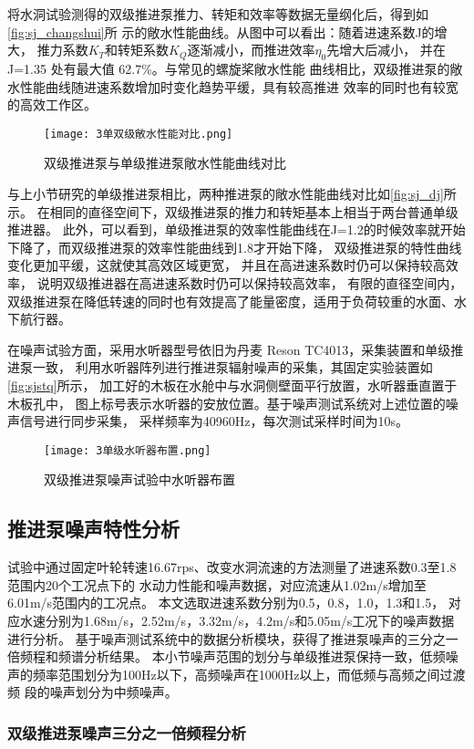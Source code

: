 将水洞试验测得的双级推进泵推力、转矩和效率等数据无量纲化后，得到如\autoref{fig:sj_changshui}所
示的敞水性能曲线。从图中可以看出：随着进速系数J的增大，
推力系数$K_T$和转矩系数$K_Q$逐渐减小，而推进效率$\eta_0$先增大后减小，
并在 J=1.35 处有最大值 62.7\%。与常见的螺旋桨敞水性能
曲线相比，双级推进泵的敞水性能曲线随进速系数增加时变化趋势平缓，具有较高推进
效率的同时也有较宽的高效工作区。
\begin{figure}[htbp]
    \centering
    \texttt{[image: 3单双级敞水性能对比.png]}
    \caption{\label{fig:sj_dj}双级推进泵与单级推进泵敞水性能曲线对比}
\end{figure}

与上小节研究的单级推进泵相比，两种推进泵的敞水性能曲线对比如\autoref{fig:sj_dj}所示。
在相同的直径空间下，双级推进泵的推力和转矩基本上相当于两台普通单级推进器。
此外，可以看到，单级推进泵的效率性能曲线在J=1.2的时候效率就开始下降了，而双级推进泵的效率性能曲线到1.8才开始下降，
双级推进泵的特性曲线变化更加平缓，这就使其高效区域更宽，
并且在高进速系数时仍可以保持较高效率，
说明双级推进器在高进速系数时仍可以保持较高效率，
有限的直径空间内，双级推进泵在降低转速的同时也有效提高了能量密度，适用于负荷较重的水面、水下航行器。

在噪声试验方面，采用水听器型号依旧为丹麦 Reson TC4013，采集装置和单级推进泵一致，
利用水听器阵列进行推进泵辐射噪声的采集，其固定实验装置如\autoref{fig:sjstq}所示，
加工好的木板在水舱中与水洞侧壁面平行放置，水听器垂直置于木板孔中，
图上标号表示水听器的安放位置。基于噪声测试系统对上述位置的噪声信号进行同步采集，
采样频率为40960Hz，每次测试采样时间为10s。
\begin{figure}[htbp]
    \centering
    \texttt{[image: 3单级水听器布置.png]}
    \caption{\label{fig:sjstq}双级推进泵噪声试验中水听器布置}
\end{figure}
\subsection{推进泵噪声特性分析}
试验中通过固定叶轮转速16.67rps、改变水洞流速的方法测量了进速系数0.3至1.8范围内20个工况点下的
水动力性能和噪声数据，对应流速从1.02m/s增加至6.01m/s范围内的工况点。
本文选取进速系数分别为0.5，0.8，1.0，1.3和1.5，
对应水速分别为1.68m/s，2.52m/s，3.32m/s，4.2m/s和5.05m/s工况下的噪声数据进行分析。
基于噪声测试系统中的数据分析模块，获得了推进泵噪声的三分之一倍频程和频谱分析结果。
本小节噪声范围的划分与单级推进泵保持一致，低频噪声的频率范围划分为100Hz以下，高频噪声在1000Hz以上，而低频与高频之间过渡频
段的噪声划分为中频噪声。
\subsubsection{双级推进泵噪声三分之一倍频程分析}

